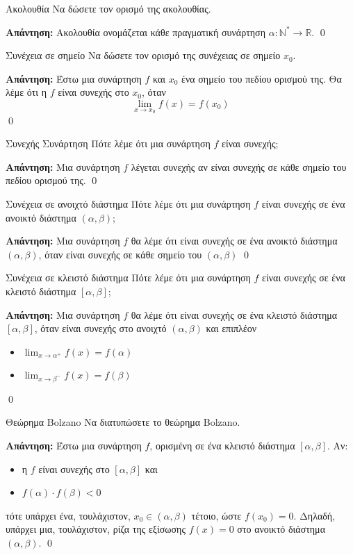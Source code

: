 \documentclass[a4paper, 12pt]{article}
\renewenvironment{proof}[1][\textbf{Απάντηση}]{%
  \par\noindent\textbf{#1:} \rmfamily}{\qed\par}
\begin{document}
\begin{theorem}{Ακολουθία}
  Να δώσετε τον ορισμό της ακολουθίας.
\end{theorem}
\begin{proof}
  Ακολουθία ονομάζεται κάθε πραγματική συνάρτηση $α : \mathbb{N}^* \to \mathbb{R}$.
\end{proof}

\begin{theorem}{Συνέχεια σε σημείο}
  Να δώσετε τον ορισμό της συνέχειας σε σημείο $x_0$.
\end{theorem}
\begin{proof}
  Έστω μια συνάρτηση $f$ και $x_0$ ένα σημείο του πεδίου ορισμού της. Θα λέμε ότι η $f$ είναι συνεχής στο $x_0$, όταν
  $$\lim_{x \to x_0} f(x) = f(x_0)$$
\end{proof}

\begin{theorem}{Συνεχής Συνάρτηση}
  Πότε λέμε ότι μια συνάρτηση $f$ είναι συνεχής;
\end{theorem}
\begin{proof}
  Μια συνάρτηση $f$ λέγεται συνεχής αν είναι συνεχής σε κάθε σημείο του πεδίου ορισμού της.
\end{proof}

\begin{theorem}{Συνέχεια σε ανοιχτό διάστημα}
  Πότε λέμε ότι μια συνάρτηση $f$ είναι συνεχής σε ένα ανοικτό διάστημα  $(α, β)$;
\end{theorem}
\begin{proof}
  Μια συνάρτηση $f$ θα λέμε ότι είναι συνεχής σε ένα ανοικτό διάστημα $(α, β)$, όταν είναι συνεχής σε κάθε σημείο του $(α, β)$
\end{proof}

\begin{theorem}{Συνέχεια σε κλειστό διάστημα}
  Πότε λέμε ότι μια συνάρτηση $f$ είναι συνεχής σε ένα κλειστό διάστημα  $[α, β]$;
\end{theorem}
\begin{proof}
  Μια συνάρτηση $f$ θα λέμε ότι είναι συνεχής σε ένα κλειστό διάστημα $[α, β]$, όταν είναι συνεχής στο ανοιχτό $(α, β)$ και επιπλέον
  \begin{itemize}
    \item $\lim_{x \to α^+} f(x) = f(α)$
    \item $\lim_{x \to β^-} f(x) = f(β)$
  \end{itemize}
\end{proof}

\begin{theorem}{Θεώρημα Bolzano}
  Να διατυπώσετε το θεώρημα Bolzano.
\end{theorem}
\begin{proof}
  Έστω μια συνάρτηση $f$, ορισμένη σε ένα κλειστό διάστημα $[α, β]$. Αν:
  \begin{itemize}
    \item η $f$ είναι συνεχής στο $[α, β]$ και
    \item $f(α)\cdot f(β) < 0$
  \end{itemize}
  τότε υπάρχει ένα, τουλάχιστον, $x_0 \in (α,β )$ τέτοιο, ώστε $f(x_0) = 0$.
  Δηλαδή, υπάρχει μια, τουλάχιστον, ρίζα της εξίσωσης $f(x) = 0$ στο ανοικτό διάστημα $(α, β)$.
\end{proof}
\end{document}
